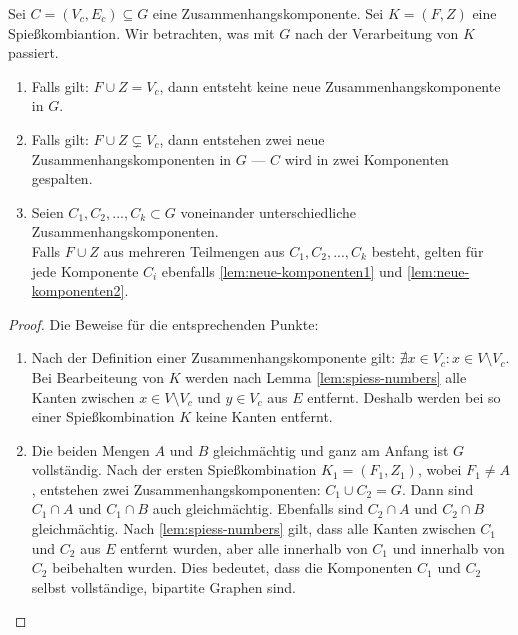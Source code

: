\begin{lemma}\label{lem:neue-komponenten}
Sei $C = (V_c, E_c) \subseteq G$ eine Zusammenhangskomponente.
Sei $K = (F, Z)$ eine Spießkombiantion.
Wir betrachten, was mit $G$ nach der Verarbeitung von $K$ passiert.

\begin{enumerate}[label={\upshape(\roman*)}]
  \item Falls gilt: $F \cup Z = V_c$, dann entsteht keine neue Zusammenhangskomponente in $G$. \label{lem:neue-komponenten1}
  \item Falls gilt: $F \cup Z \subsetneq V_c$,%
  dann entstehen zwei neue Zusammenhangskomponenten in $G$ --- $C$ wird in zwei Komponenten gespalten.\label{lem:neue-komponenten2}
  \item Seien $C_1, C_2, ..., C_k \subset G$ voneinander unterschiedliche Zusammenhangskomponenten.\\
  Falls $F \cup Z$ aus mehreren Teilmengen aus $C_1, C_2, ..., C_k$ besteht, gelten für jede Komponente $C_i$ ebenfalls \ref{lem:neue-komponenten1} und \ref{lem:neue-komponenten2}.
\end{enumerate}

\end{lemma}

\begin{proof}
Die Beweise für die entsprechenden Punkte:
\begin{enumerate}[label={\upshape(\roman*)}]
  \item Nach der Definition einer Zusammenhangskomponente gilt: $\nexists x \in V_c: x \in V \setminus V_c$.
  Bei Bearbeiteung von $K$ werden nach Lemma \ref{lem:spiess-numbers} alle Kanten zwischen 
  $x \in V \setminus V_c$ und $y \in V_c$ aus $E$ entfernt.
  Deshalb werden bei so einer Spießkombination $K$ keine Kanten entfernt.
  \item%
  Die beiden Mengen $A$ und $B$ gleichmächtig und ganz am Anfang ist $G$ vollständig.
  Nach der ersten Spießkombination $K_1 = (F_1, Z_1)$, wobei $F_1 \neq A$, 
  entstehen zwei Zusammenhangskomponenten: $C_1 \cup C_2 = G$.
  Dann sind $C_1 \cap A$ und $C_1 \cap B$ auch gleichmächtig. 
  Ebenfalls sind $C_2 \cap A$ und $C_2 \cap B$ gleichmächtig.
  Nach \ref{lem:spiess-numbers} gilt, dass alle Kanten zwischen $C_1$ und $C_2$
  aus $E$ entfernt wurden, aber alle innerhalb von $C_1$ und innerhalb von $C_2$
  beibehalten wurden.
  Dies bedeutet, dass die Komponenten $C_1$ und $C_2$ selbst vollständige, bipartite Graphen sind.
\end{enumerate}
\end{proof}



